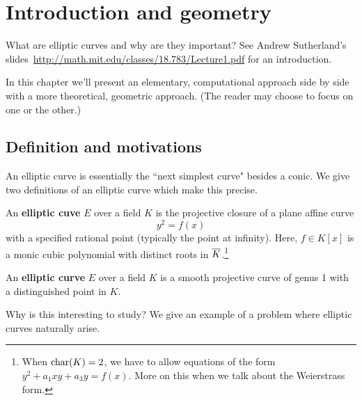 \chapter{Introduction and geometry}

What are elliptic curves and why are they important? See Andrew Sutherland's slides~\url{http://math.mit.edu/classes/18.783/Lecture1.pdf} for an introduction.

In this chapter we'll present an elementary, computational approach side by side with a more theoretical, geometric approach. (The reader may choose to focus on one or the other.)

\section{Definition and motivations}

An elliptic curve is essentially the ``next simplest curve" besides a conic. We give two definitions of an elliptic curve which make this precise.
\begin{df}
An \textbf{elliptic cuve} $E$ over a field $K$ is the projective closure of a plane affine curve \[y^2=f(x)\] with a specified rational point (typically the point at infinity). 
Here, $f\in K[x]$ is a monic cubic polynomial with distinct roots in $\overline{K}$.\footnote{When $\operatorname{char}(K)=2$, we have to allow equations of the form $y^2+a_1xy+a_3y=f(x)$. More on this when we talk about the Weierstrass form.}
\end{df}

\begin{df}
An \textbf{elliptic curve} $E$ over a field $K$ is a smooth projective curve of genus 1 with a distinguished point in $K$.
\end{df}

Why is this interesting to study? We give an example of a problem where elliptic curves naturally arise.



